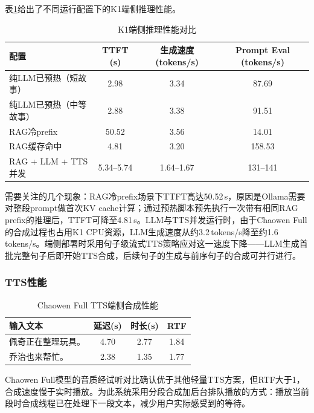 \documentclass[lettersize,journal]{IEEEtran}
\begin{document}
表\ref{tab:infer}给出了不同运行配置下的K1端侧推理性能。

\begin{table}[!t]
    \centering
    \caption{K1端侧推理性能对比}
    \label{tab:infer}
    \begin{tabular}{lccc}
        \toprule
        \textbf{配置} & \textbf{TTFT (s)} & \textbf{生成速度 (tokens/s)} & \textbf{Prompt Eval (tokens/s)} \\
        \midrule
        纯LLM已预热（短故事） & 2.98 & 3.34 & 87.69 \\
        纯LLM已预热（中等故事） & 2.88 & 3.38 & 91.51 \\
        RAG冷prefix & 50.52 & 3.56 & 14.01 \\
        RAG缓存命中 & 4.81 & 3.20 & 158.53 \\
        RAG + LLM + TTS并发 & 5.34--5.74 & 1.64--1.67 & 131--141 \\
        \bottomrule
    \end{tabular}
\end{table}

需要关注的几个现象：RAG冷prefix场景下TTFT高达50.52\,s，原因是Ollama需要对整段prompt做首次KV cache计算；通过预热脚本预先执行一次带有相同RAG prefix的推理后，TTFT可降至4.81\,s。LLM与TTS并发运行时，由于Chaowen Full的合成过程也占用K1 CPU资源，LLM生成速度从约3.2\,tokens/s降至约1.6\,tokens/s。端侧部署时采用句子级流式TTS策略应对这一速度下降——LLM生成首批完整句子后即开始TTS合成，后续句子的生成与前序句子的合成可并行进行。

\subsubsection{TTS性能}

\begin{table}[H]
    \centering
    \caption{Chaowen Full TTS端侧合成性能}
    \label{tab:tts}
    \footnotesize
    \begin{tabular}{p{2.2cm}ccc}
        \toprule
        \textbf{输入文本} & \textbf{延迟(s)} & \textbf{时长(s)} & \textbf{RTF} \\
        \midrule
        佩奇正在整理玩具。 & 4.70 & 2.77 & 1.84 \\
        乔治也来帮忙。 & 2.38 & 1.35 & 1.77 \\
        \bottomrule
    \end{tabular}
\end{table}

Chaowen Full模型的音质经试听对比确认优于其他轻量TTS方案，但RTF大于1，合成速度慢于实时播放。为此系统采用分段合成加后台排队播放的方式：播放当前段时合成线程已在处理下一段文本，减少用户实际感受到的等待。
\end{document}
